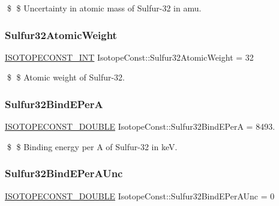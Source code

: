 \$ \$ Uncertainty in atomic mass of Sulfur-\/32 in amu. \mbox{\label{group___isotope_const-_sulfur-_s32_ga73c2c490cbee5b7a3d72b27bad91fb6f}} 
\subsubsection{\texorpdfstring{Sulfur32\+Atomic\+Weight}{Sulfur32AtomicWeight}}
{\footnotesize\ttfamily \mbox{\hyperlink{group___isotope_const-_macros_ga5f18360b3e99483a35c32d789e62621c}{I\+S\+O\+T\+O\+P\+E\+C\+O\+N\+S\+T\+\_\+\+I\+NT}} Isotope\+Const\+::\+Sulfur32\+Atomic\+Weight = 32}

\$ \$ Atomic weight of Sulfur-\/32. \mbox{\label{group___isotope_const-_sulfur-_s32_gaebb2c2c2d1c0cfa84956fb0bb419c3ac}} 
\subsubsection{\texorpdfstring{Sulfur32\+Bind\+E\+PerA}{Sulfur32BindEPerA}}
{\footnotesize\ttfamily \mbox{\hyperlink{group___isotope_const-_macros_ga8f45a7272ce02c0b4c65c44636ed719a}{I\+S\+O\+T\+O\+P\+E\+C\+O\+N\+S\+T\+\_\+\+D\+O\+U\+B\+LE}} Isotope\+Const\+::\+Sulfur32\+Bind\+E\+PerA = 8493.}

\$ \$ Binding energy per A of Sulfur-\/32 in keV. \mbox{\label{group___isotope_const-_sulfur-_s32_gaf7e15143affa292b2a3899755e04680d}} 
\subsubsection{\texorpdfstring{Sulfur32\+Bind\+E\+Per\+A\+Unc}{Sulfur32BindEPerAUnc}}
{\footnotesize\ttfamily \mbox{\hyperlink{group___isotope_const-_macros_ga8f45a7272ce02c0b4c65c44636ed719a}{I\+S\+O\+T\+O\+P\+E\+C\+O\+N\+S\+T\+\_\+\+D\+O\+U\+B\+LE}} Isotope\+Const\+::\+Sulfur32\+Bind\+E\+Per\+A\+Unc = 0}

